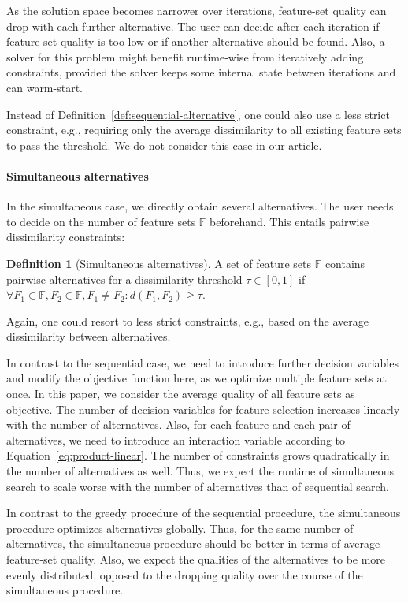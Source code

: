 \documentclass{article}
\theoremstyle{definition}
\newtheorem{definition}{Definition}
\begin{document}
As the solution space becomes narrower over iterations, feature-set quality can drop with each further alternative.
The user can decide after each iteration if feature-set quality is too low or if another alternative should be found.
Also, a solver for this problem might benefit runtime-wise from iteratively adding constraints, provided the solver keeps some internal state between iterations and can warm-start.

Instead of Definition~\ref{def:sequential-alternative}, one could also use a less strict constraint, e.g., requiring only the average dissimilarity to all existing feature sets to pass the threshold.
We do not consider this case in our article.

\paragraph{Simultaneous alternatives}

In the simultaneous case, we directly obtain several alternatives.
The user needs to decide on the number of feature sets $\mathbb{F}$ beforehand.
This entails pairwise dissimilarity constraints:
%
\begin{definition}[Simultaneous alternatives]
	A set of feature sets $\mathbb{F}$ contains pairwise alternatives for a dissimilarity threshold $\tau \in [0,1]$ if $\forall F_1 \in \mathbb{F}, F_2 \in \mathbb{F}, F_1 \neq F_2: d(F_1,F_2) \geq \tau$.
	\label{def:simultaneous-alternative}
\end{definition}
%
Again, one could resort to less strict constraints, e.g., based on the average dissimilarity between alternatives.

In contrast to the sequential case, we need to introduce further decision variables and modify the objective function here, as we optimize multiple feature sets at once.
In this paper, we consider the average quality of all feature sets as objective.
The number of decision variables for feature selection increases linearly with the number of alternatives.
Also, for each feature and each pair of alternatives, we need to introduce an interaction variable according to Equation~\ref{eq:product-linear}.
The number of constraints grows quadratically in the number of alternatives as well.
Thus, we expect the runtime of simultaneous search to scale worse with the number of alternatives than of sequential search.

In contrast to the greedy procedure of the sequential procedure, the simultaneous procedure optimizes alternatives globally.
Thus, for the same number of alternatives, the simultaneous procedure should be better in terms of average feature-set quality.
Also, we expect the qualities of the alternatives to be more evenly distributed, opposed to the dropping quality over the course of the simultaneous procedure.
\end{document}
